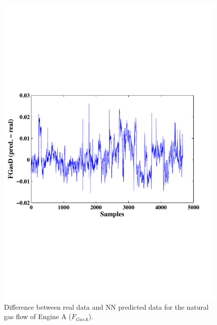 \begin{figure}
\centering
\includegraphics[width=1\textwidth]{figures/FGASDdiff.pdf}
\caption{Difference between real data and NN predicted data for the natural gas flow  of Engine A ($F_{GasA}$).}
\label{FengineA}
\end{figure}

